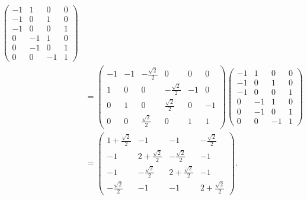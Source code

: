 {\begin{loesung}
\begin{teilaufgaben}
\begin{align*}
\begin{pmatrix}
  -1&  1&  0&  0\\
  -1&  0&  1&  0\\
  -1&  0&  0&  1\\
   0& -1&  1&  0\\
   0& -1&  0&  1\\
   0&  0& -1&  1
\end{pmatrix}
\\
&=
\begin{pmatrix}
-1&-1&-\frac{\sqrt{2}}2&                0& 0& 0\\
 1& 0&                0&-\frac{\sqrt{2}}2&-1& 0\\
 0& 1&                0& \frac{\sqrt{2}}2& 0&-1\\
 0& 0& \frac{\sqrt{2}}2&                0& 1& 1
\end{pmatrix}
\begin{pmatrix}
  -1&  1&  0&  0\\
  -1&  0&  1&  0\\
  -1&  0&  0&  1\\
   0& -1&  1&  0\\
   0& -1&  0&  1\\
   0&  0& -1&  1
\end{pmatrix}
\\
&=
\begin{pmatrix}
 1+\frac{\sqrt{2}}2&                -1&                -1& -\frac{\sqrt{2}}2\\
-1                 &2+\frac{\sqrt{2}}2& -\frac{\sqrt{2}}2&                -1\\
-1                 & -\frac{\sqrt{2}}2&2+\frac{\sqrt{2}}2&                -1\\
  -\frac{\sqrt{2}}2&                -1&                -1&2+\frac{\sqrt{2}}2
\end{pmatrix}.
\end{align*}
\end{teilaufgaben}
\end{loesung}
}{}

